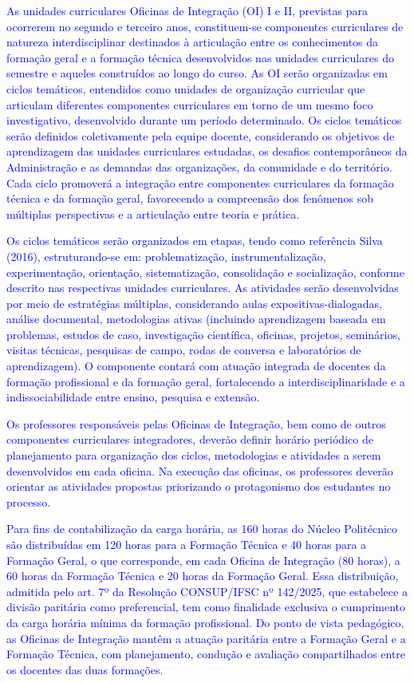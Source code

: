 \documentclass{../../modelos/latex-shared/ifsc-ppc}
\newcommand{\revisao}[1]{\textcolor{blue}{#1}}
\newcommand{\revisao}[1]{#1}
\begin{document}
\revisao{As unidades curriculares Oficinas de Integração (OI) I e II, previstas para ocorrerem no segundo e terceiro anos, constituem-se componentes curriculares de natureza interdisciplinar destinados à articulação entre os conhecimentos da formação geral e a formação técnica desenvolvidos nas unidades curriculares do semestre e aqueles construídos ao longo do curso. As OI serão organizadas em ciclos temáticos, entendidos como unidades de organização curricular que articulam diferentes componentes curriculares em torno de um mesmo foco investigativo, desenvolvido durante um período determinado. Os ciclos temáticos serão definidos coletivamente pela equipe docente, considerando os objetivos de aprendizagem das unidades curriculares estudadas, os desafios contemporâneos da Administração e as demandas das organizações, da comunidade e do território. Cada ciclo promoverá a integração entre componentes curriculares da formação técnica e da formação geral, favorecendo a compreensão dos fenômenos sob múltiplas perspectivas e a articulação entre teoria e prática.}

\revisao{Os ciclos temáticos serão organizados em etapas, tendo como referência Silva (2016), estruturando-se em: problematização, instrumentalização, experimentação, orientação, sistematização, consolidação e socialização, conforme descrito nas respectivas unidades curriculares. As atividades serão desenvolvidas por meio de estratégias múltiplas, considerando aulas expositivas-dialogadas, análise documental, metodologias ativas (incluindo aprendizagem baseada em problemas, estudos de caso, investigação científica, oficinas, projetos, seminários, visitas técnicas, pesquisas de campo, rodas de conversa e laboratórios de aprendizagem). O componente contará com atuação integrada de docentes da formação profissional e da formação geral, fortalecendo a interdisciplinaridade e a indissociabilidade entre ensino, pesquisa e extensão.}

\revisao{Os professores responsáveis pelas Oficinas de Integração, bem como de outros componentes curriculares integradores, deverão definir horário periódico de planejamento para organização dos ciclos, metodologias e atividades a serem desenvolvidos em cada oficina. Na execução das oficinas, os professores deverão orientar as atividades propostas priorizando o protagonismo dos estudantes no processo.}

\revisao{Para fins de contabilização da carga horária, as 160 horas do Núcleo Politécnico são distribuídas em 120 horas para a Formação Técnica e 40 horas para a Formação Geral, o que corresponde, em cada Oficina de Integração (80 horas), a 60 horas da Formação Técnica e 20 horas da Formação Geral. Essa distribuição, admitida pelo art. 7º da Resolução CONSUP/IFSC nº 142/2025, que estabelece a divisão paritária como preferencial, tem como finalidade exclusiva o cumprimento da carga horária mínima da formação profissional. Do ponto de vista pedagógico, as Oficinas de Integração mantêm a atuação paritária entre a Formação Geral e a Formação Técnica, com planejamento, condução e avaliação compartilhados entre os docentes das duas formações.}
\end{document}
